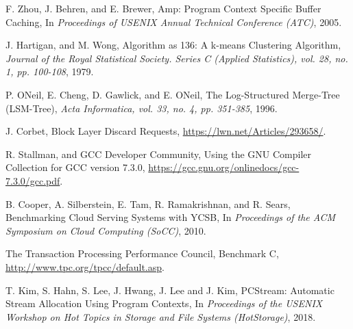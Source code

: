 \begin{thebibliography}{00}
F. Zhou, J. Behren, and E. Brewer,
Amp: Program Context Specific Buffer Caching,
In \textit{Proceedings of USENIX Annual Technical Conference (ATC)}, 2005.

J. Hartigan, and M. Wong,
Algorithm as 136: A k-means Clustering Algorithm,
\textit{Journal of the Royal Statistical Society. Series C (Applied Statistics),
vol. 28, no. 1, pp. 100-108}, 1979.

P. ONeil, E. Cheng, D. Gawlick, and E. ONeil,
The Log-Structured Merge-Tree (LSM-Tree),
\textit{Acta Informatica, vol. 33, no. 4, pp. 351-385}, 1996.

J. Corbet,
Block Layer Discard Requests,
\url{https://lwn.net/Articles/293658/}.

R. Stallman, and GCC Developer Community,
Using the GNU Compiler Collection for GCC version 7.3.0,
\url{https://gcc.gnu.org/onlinedocs/gcc-7.3.0/gcc.pdf}.

B. Cooper, A. Silberstein, E. Tam, R. Ramakrishnan, and R. Sears,
Benchmarking Cloud Serving Systems with YCSB,
In \textit{Proceedings of the ACM Symposium on Cloud Computing (SoCC)}, 2010.

The Transaction Processing Performance Council,
Benchmark C,
\url{http://www.tpc.org/tpcc/default.asp}. 

T. Kim, S. Hahn, S. Lee, J. Hwang, J. Lee and J. Kim,
PCStream: Automatic Stream Allocation Using Program Contexts,
In \textit{Proceedings of the USENIX Workshop on Hot Topics in Storage
and File Systems (HotStorage)}, 2018.


\end{thebibliography}
